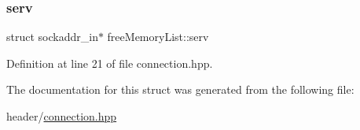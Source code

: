\subsubsection{\texorpdfstring{serv}{serv}}
{\footnotesize\ttfamily struct sockaddr\+\_\+in$\ast$ free\+Memory\+List\+::serv}



Definition at line 21 of file connection.\+hpp.



The documentation for this struct was generated from the following file\+:\begin{DoxyCompactItemize}
\item 
header/\hyperlink{connection_8hpp}{connection.\+hpp}\end{DoxyCompactItemize}
